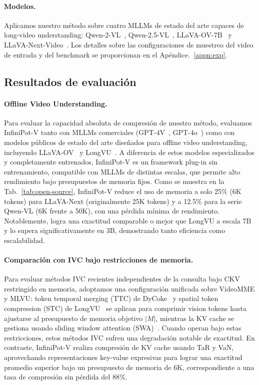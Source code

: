 \paragraph{Modelos.}
Aplicamos nuestro método sobre cuatro MLLMs de estado del arte capaces de long-video understanding: Qwen-2-VL~\cite{Qwen2VL}, Qwen-2.5-VL~\cite{qwen2.5}, LLaVA-OV-7B~\cite{li2024llava} y LLaVA-Next-Video~\cite{zhang2024llavanext-video}. Los detalles sobre las configuraciones de muestreo del video de entrada y del benchmark se proporcionan en el Apéndice.~\ref{appn:exp}.

\subsection{Resultados de evaluación}
\paragraph{Offline Video Understanding. } 
Para evaluar la capacidad absoluta de compresión de nuestro método, evaluamos InfiniPot-V tanto con MLLMs comerciales (GPT-4V~\cite{openai2023gpt4v}, GPT-4o~\cite{openai2023gpt4o}) como con modelos públicos de estado del arte diseñados para offline video understanding, incluyendo LLaVA-OV~\cite{li2024llava} y LongVU~\cite{shen2024longvu}. A diferencia de estos modelos especializados y completamente entrenados, InfiniPot-V es un framework plug-in sin entrenamiento, compatible con MLLMs de distintas escalas, que permite alto rendimiento bajo presupuestos de memoria fijos.
Como se muestra en la Tab.~\ref{tab:open-source}, InfiniPot-V reduce el uso de memoria a solo 25\% (6K tokens) para LLaVA-Next (originalmente 25K tokens) y a 12.5\% para la serie Qwen-VL (6K frente a 50K), con una pérdida mínima de rendimiento. Notablemente, logra una exactitud comparable o mejor que LongVU a escala 7B y lo supera significativamente en 3B, demostrando tanto eficiencia como escalabilidad.

\paragraph{Comparación con IVC bajo restricciones de memoria.}
Para evaluar métodos IVC recientes independientes de la consulta bajo CKV restringido en memoria, adoptamos una configuración unificada sobre VideoMME y MLVU: token temporal merging (TTC) de DyCoke~\cite{tao2024dycokedynamiccompressiontokens} y spatial token compression (STC) de LongVU~\cite{shen2024longvu} se aplican para comprimir vision tokens hasta ajustarse al presupuesto de memoria objetivo $|M|$, mientras la KV cache se gestiona usando sliding window attention (SWA)~\cite{Beltagy2020Longformer}. Cuando operan bajo estas restricciones, estos métodos IVC sufren una degradación notable de exactitud. En contraste, InfiniPot-V realiza compresión de KV cache usando TaR y VaN, aprovechando representaciones key-value expresivas para lograr una exactitud promedio superior bajo un presupuesto de memoria de 6K, correspondiente a una tasa de compresión sin pérdida del 88\%.

